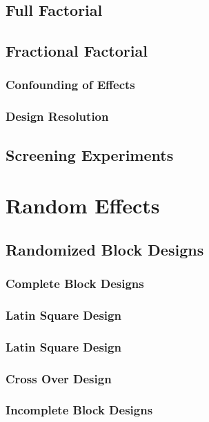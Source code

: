 \subsection{Full Factorial}

\subsection{Fractional Factorial}

\subsubsection{Confounding of Effects}

\subsubsection{Design Resolution}


\subsection{Screening Experiments}

\section{Random Effects}

\subsection{Randomized Block Designs}

\subsubsection{Complete Block Designs}


\subsubsection{Latin Square Design}

\subsubsection{Latin Square Design}

\subsubsection{Cross Over Design}

\subsubsection{Incomplete Block Designs}


